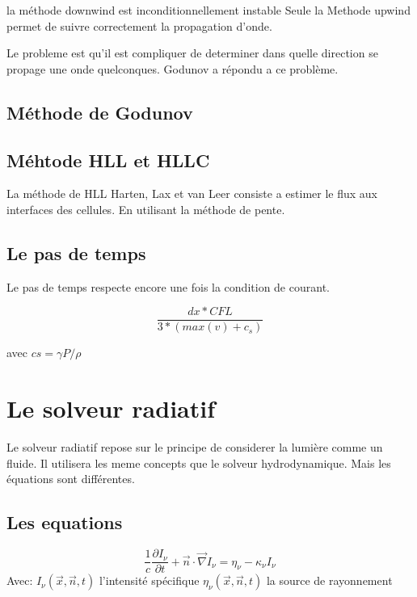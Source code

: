 la méthode downwind est inconditionnellement instable
Seule la Methode upwind permet de suivre correctement la propagation d'onde.

Le probleme est qu'il est compliquer de determiner dans quelle direction se propage une onde quelconques.
Godunov a répondu a ce problème.

\subsection{Méthode de Godunov}



\subsection{Méhtode HLL et HLLC }
La méthode de HLL Harten, Lax et van Leer consiste a estimer le flux aux interfaces des cellules.
En utilisant la méthode de pente.

\subsection{Le pas de temps}

Le pas de temps respecte encore une fois la condition de courant.

\begin{equation}
\frac{dx * CFL }{3*(max(v) + c_s)}
\end{equation}

avec $cs = \gamma P/\rho$

\section{Le solveur radiatif}

Le solveur radiatif repose sur le principe de considerer la lumière comme un fluide.
Il utilisera les meme concepts que le solveur hydrodynamique.
Mais les équations sont différentes. 



\subsection{Les equations}
\begin{equation}
\frac{1}{c} \frac{\partial I_\nu}{\partial t} + \vec{n}\cdot \vec{\nabla} I_\nu = \eta_\nu - \kappa_\nu I_\nu 
\end{equation}
Avec: $I_\nu(\vec{x},\vec{n},t)$ l'intensité spécifique
$\eta_\nu(\vec{x},\vec{n},t)$ la source de rayonnement


